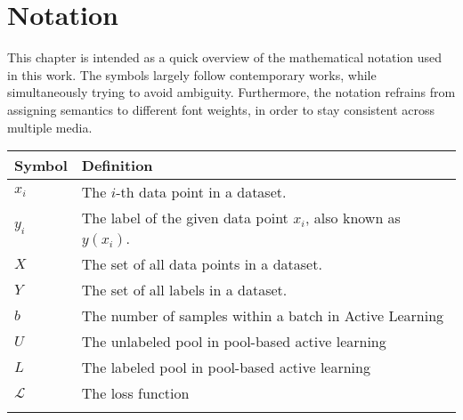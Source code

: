 \chapter*{Notation}
\label{ch:notation}


This chapter is intended as a quick overview of the mathematical notation used in this work.
The symbols largely follow contemporary works, while simultaneously trying to avoid ambiguity.
Furthermore, the notation refrains from assigning semantics to different font weights, in order to stay consistent across multiple media.

\begin{tabularx}{\textwidth}{l X}
    \toprule
    Symbol & Definition \\
    \midrule
    $x_i$ & The $i$-th data point in a dataset. \\ \addlinespace
    $y_i$ & The label of the given data point $x_i$, also known as $y(x_i)$. \\ \addlinespace
    $X$ & The set of all data points in a dataset. \\ \addlinespace
    $Y$ & The set of all labels in a dataset. \\ \addlinespace
    $b$ & The number of samples within a batch in Active Learning \\ \addlinespace
    $U$ & The unlabeled pool in pool-based active learning\\ \addlinespace
    $L$ & The labeled pool in pool-based active learning\\ \addlinespace
    $\mathcal{L}$ & The loss function \\ \addlinespace
    \bottomrule
\end{tabularx}
\label{tab:notation}